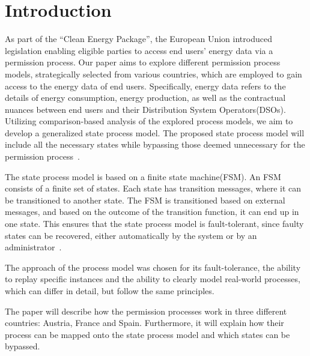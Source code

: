 \section{Introduction}\label{sec:introduction}
As part of the ``Clean Energy Package'', the European Union introduced legislation enabling eligible parties to access end users' energy data via a permission process.
Our paper aims to explore different permission process models, strategically selected from various countries, which are employed to gain access to the energy data of end users.
Specifically, energy data refers to the details of energy consumption, energy production, as well as the contractual nuances between end users and their Distribution System Operators(DSOs).
Utilizing comparison-based analysis of the explored process models, we aim to develop a generalized state process model.
The proposed state process model will include all the necessary states while bypassing those deemed unnecessary for the permission process~\cite{clean-energy}.

The state process model is based on a finite state machine(FSM).
An FSM consists of a finite set of states.
Each state has transition messages, where it can be transitioned to another state.
The FSM is transitioned based on external messages, and based on the outcome of the transition function,
it can end up in one state.
This ensures that the state process model is fault-tolerant,
since faulty states can be recovered, either automatically by the system or by an administrator~\cite{asm}.

The approach of the process model was chosen for its fault-tolerance,
the ability to replay specific instances and the ability to clearly model real-world processes,
which can differ in detail, but follow the same principles.

The paper will describe how the permission processes work in three different countries: Austria, France and Spain.
Furthermore,
it will explain how their process can be mapped onto the state process model and which states can be bypassed.

